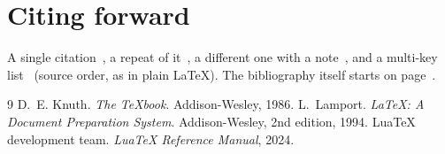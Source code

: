 \documentclass{article}
\begin{document}
\section{Citing forward}\label{sec:cite}
A single citation~\cite{knuth}, a repeat of it~\cite{knuth}, a
different one with a note~\cite[Chapter~2]{lamport}, and a multi-key
list~\cite{knuth,luatex,lamport} (source order, as in plain \LaTeX).
The bibliography itself starts on page~\pageref{bib:start}.

\begin{thebibliography}{9}\label{bib:start}
 D.~E. Knuth. \emph{The \TeX book}. Addison-Wesley, 1986.
 L.~Lamport. \emph{\LaTeX: A Document Preparation
  System}. Addison-Wesley, 2nd edition, 1994.
 LuaTeX development team. \emph{LuaTeX Reference
  Manual}, 2024.
\end{thebibliography}
\end{document}
